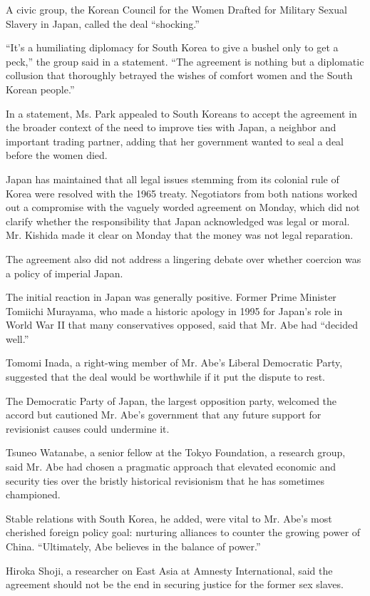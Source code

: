 A civic group, the Korean Council for the Women Drafted for Military
Sexual Slavery in Japan, called the deal ``shocking.''

``It's a humiliating diplomacy for South Korea to give a bushel only to
get a peck,'' the group said in a statement. ``The agreement is nothing
but a diplomatic collusion that thoroughly betrayed the wishes of
comfort women and the South Korean people.''

In a statement, Ms. Park appealed to South Koreans to accept the
agreement in the broader context of the need to improve ties with Japan,
a neighbor and important trading partner, adding that her government
wanted to seal a deal before the women died.

Japan has maintained that all legal issues stemming from its colonial
rule of Korea were resolved with the 1965 treaty. Negotiators from both
nations worked out a compromise with the vaguely worded agreement on
Monday, which did not clarify whether the responsibility that Japan
acknowledged was legal or moral. Mr. Kishida made it clear on Monday
that the money was not legal reparation.

The agreement also did not address a lingering debate over whether
coercion was a policy of imperial Japan.

The initial reaction in Japan was generally positive. Former Prime
Minister Tomiichi Murayama, who made a historic apology in 1995 for
Japan's role in World War II that many conservatives opposed, said that
Mr. Abe had ``decided well.''

Tomomi Inada, a right-wing member of Mr. Abe's Liberal Democratic Party,
suggested that the deal would be worthwhile if it put the dispute to
rest.

The Democratic Party of Japan, the largest opposition party, welcomed
the accord but cautioned Mr. Abe's government that any future support
for revisionist causes could undermine it.

Tsuneo Watanabe, a senior fellow at the Tokyo Foundation, a research
group, said Mr. Abe had chosen a pragmatic approach that elevated
economic and security ties over the bristly historical revisionism that
he has sometimes championed.

Stable relations with South Korea, he added, were vital to Mr. Abe's
most cherished foreign policy goal: nurturing alliances to counter the
growing power of China. ``Ultimately, Abe believes in the balance of
power.''

Hiroka Shoji, a researcher on East Asia at Amnesty International, said
the agreement should not be the end in securing justice for the former
sex slaves.


